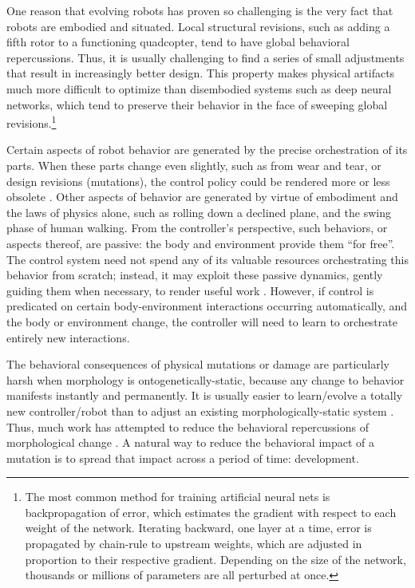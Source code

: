 One reason that evolving robots 
has proven so challenging is the very fact that robots are embodied and situated.
Local structural revisions, such as adding a fifth rotor to a functioning quadcopter, tend to have global behavioral repercussions.
Thus, it is usually challenging to find a series of small adjustments that result in increasingly better design. 
This property makes physical artifacts much more difficult to optimize than disembodied systems such as deep neural networks, which tend to preserve their behavior in the face of sweeping global revisions.\footnote{%
The most common method for training artificial neural nets is backpropagation of error, which
estimates the gradient with respect to each weight of the network.
Iterating backward, one layer at a time, error is propagated by chain-rule to upstream weights, which are adjusted in proportion to their respective gradient.
Depending on the size of the network, thousands or millions of parameters are all perturbed at once.%
}

Certain aspects of robot behavior are generated by the precise orchestration of its parts.
When these parts change even slightly, 
such as from wear and tear, 
or design revisions (mutations),
the control policy could be rendered more or less obsolete \cite{bongard2006resilient,cully2015robots}.
Other aspects of behavior are generated by virtue of embodiment and the laws of physics alone, such as rolling down a declined plane, and the swing phase of human walking.
From the controller's perspective, such behaviors, or aspects thereof, are passive: the body and environment provide them ``for free''.
The control system need not spend any of its valuable resources orchestrating this behavior from scratch; instead, it may exploit these passive dynamics, gently guiding them when necessary, to render useful work \cite{vaughan2004evolution}.
However, if control is predicated on certain body-environment interactions occurring automatically, 
and the body or environment change,
the controller will need to 
learn to orchestrate entirely new interactions.

The behavioral consequences of physical mutations or damage are particularly harsh when morphology is ontogenetically-static, because any change to behavior manifests instantly and permanently.
It is usually easier to learn/evolve a totally new controller/robot than to adjust an existing morphologically-static system \cite{cheney2016difficulty}.
Thus, much work has attempted to reduce the behavioral repercussions of morphological change \cite{cheney2018scalable}.
A natural way
to reduce the behavioral impact of a mutation 
is to spread that impact across a period of time: development.




